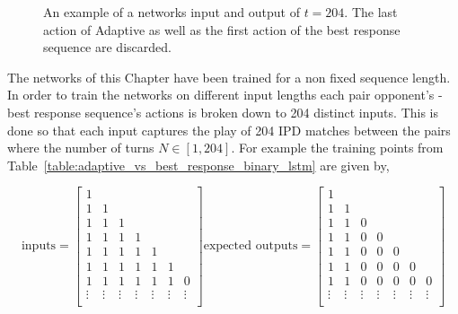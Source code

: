 \begin{figure}[!htbp]
    \centering
    
    \caption{An example of a networks input and output of \(t=204\). The last
    action of Adaptive as well as the first action of the best
    response sequence are discarded.}\label{fig:input_output_example}
\end{figure}

The networks of this Chapter have been trained for a non fixed sequence length.
In order to train the networks on different input lengths each pair opponent's -
best response sequence's actions is broken down to 204 distinct inputs. This is
done so that each input captures the play of 204 IPD matches between the pairs
where the number of turns \(N \in [1, 204]\). For example the training points
from Table~\ref{table:adaptive_vs_best_response_binary_lstm} are given by,

\begin{equation}\label{eq:sequence_to_sequence_inputs_outputs_example}
    \text{inputs} =
    \begin{bmatrix}
        1 &  &  \\
        1 & 1 &  \\
        1 & 1 & 1 \\
        1 & 1 & 1 & 1 \\
        1 & 1 & 1 & 1 & 1 \\
        1 & 1 & 1 & 1 & 1 & 1\\
        1 & 1 & 1 & 1 & 1 & 1 & 0 \\
        \vdots & \vdots & \vdots & \vdots & \vdots & \vdots & \vdots \\
    \end{bmatrix}
    \text{expected outputs} =
    \begin{bmatrix}
        1 &  &  \\
        1 & 1 &  \\
        1 & 1 & 0 \\
        1 & 1 & 0 & 0 \\
        1 & 1 & 0 & 0 & 0 \\
        1 & 1 & 0 & 0 & 0 & 0\\
        1 & 1 & 0 & 0 & 0 & 0 & 0 \\
        \vdots & \vdots & \vdots & \vdots & \vdots & \vdots & \vdots \\
    \end{bmatrix}
\end{equation}

